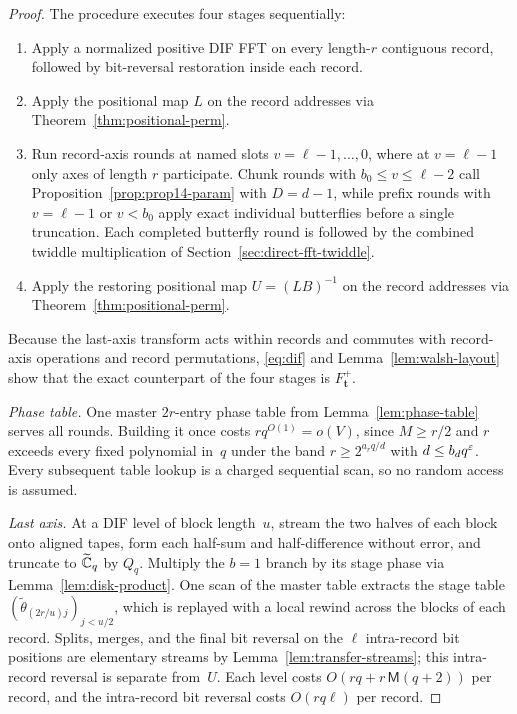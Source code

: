 \begin{proof}
The procedure executes four stages sequentially:
\begin{enumerate}[label=(\roman*),leftmargin=*]
  \item Apply a normalized positive DIF FFT on every length-$r$ contiguous record, followed by bit-reversal restoration
    inside each record.

  \item Apply the positional map $L$ on the record addresses via Theorem~\ref{thm:positional-perm}.

  \item Run record-axis rounds at named slots $v=\ell-1,\dots,0$, where at $v=\ell-1$ only axes of length $r$
    participate. Chunk rounds with $b_0\le v\le\ell-2$ call Proposition~\ref{prop:prop14-param} with $D=d-1$, while
    prefix rounds with $v=\ell-1$ or $v<b_0$ apply exact individual butterflies before a single truncation. Each
    completed butterfly round is followed by the combined twiddle multiplication of Section~\ref{sec:direct-fft-twiddle}.

  \item Apply the restoring positional map $U=(LB)^{-1}$ on the record addresses via Theorem~\ref{thm:positional-perm}.
\end{enumerate}
Because the last-axis transform acts within records and commutes with record-axis operations and record permutations,
\eqref{eq:dif} and Lemma~\ref{lem:walsh-layout} show that the exact counterpart of the four stages is
$F^+_{\mathbf t}$.

\emph{Phase table.} One master $2r$-entry phase table from Lemma~\ref{lem:phase-table} serves all rounds. Building it
once costs $rq^{O(1)}=o(V)$, since $M\ge r/2$ and $r$ exceeds every fixed polynomial in~$q$ under the band
$r\ge2^{a_rq/d}$ with $d\le b_dq^\varepsilon$. Every subsequent table lookup is a charged sequential scan, so no random access
is assumed.

\emph{Last axis.} At a DIF level of block length~$u$, stream the two halves of each block onto aligned tapes, form each
half-sum and half-difference without error, and truncate to $\widetilde{\mathbb{C}}_q$ by $Q_q$. Multiply the $b=1$ branch by its stage
phase via Lemma~\ref{lem:disk-product}. One scan of the master table extracts the stage table
$(\tilde\theta_{(2r/u)j})_{j<u/2}$, which is replayed with a local rewind across the blocks of each record. Splits,
merges, and the final bit reversal on the $\ell$ intra-record bit positions are elementary streams by
Lemma~\ref{lem:transfer-streams}; this intra-record reversal is separate from~$U$. Each level costs
$O(rq+r\,\mathsf M(q+2))$ per record, and the intra-record bit reversal costs $O(rq\ell)$ per record.


\end{proof}
